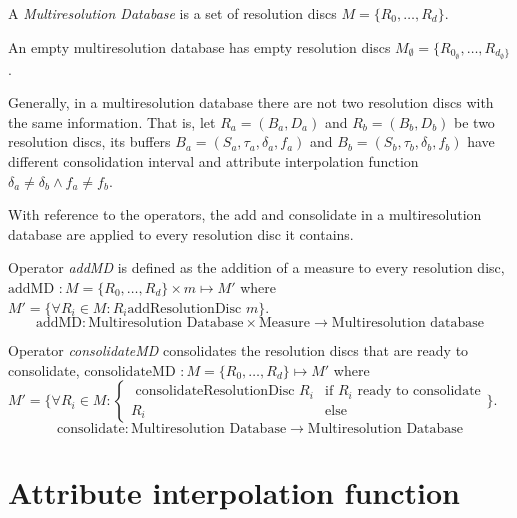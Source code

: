 \begin{definition}
  A \emph{Multiresolution Database} is a set of resolution discs
  $M=\{R_0,\dotsc,R_d\}$.
\end{definition}

An empty multiresolution database has empty resolution discs $M_{\emptyset}=\{R_{0_{\emptyset}},\dotsc,R_{d_{\emptyset}\}}$. 
 
Generally, in a multiresolution database there are not two resolution discs
with the same information. That is, let $R_a = (B_a, D_a)$ and $R_b =
(B_b, D_b)$ be two resolution discs, its buffers
$B_a=(S_a,\tau_a,\delta_a,f_a)$ and $B_b=(S_b,\tau_b,\delta_b,f_b)$
have different consolidation interval and attribute interpolation function
$\delta_a \neq \delta_b \wedge f_a \neq f_b$.


With reference to the operators, the add and consolidate in a
multiresolution database are applied to every resolution disc it
contains.


Operator \emph{addMD} is defined as the addition of a measure to every
resolution disc, $\text{addMD } : M=\{R_0,\dotsc,R_d\} \times m
\mapsto M' $ where $M'= \{ \forall R_i\in M: R_i \text{
  addResolutionDisc } m \}$.
\[
\text{addMD}: \text{Multiresolution Database} \times \text{Measure}
\longrightarrow \text{Multiresolution database}
\]


Operator \emph{consolidateMD} consolidates the resolution discs that
are ready to consolidate, $\text{consolidateMD } :
M=\{R_0,\dotsc,R_d\} \mapsto M'$ where $ M'= \big\{ \forall R_i\in M:
  \begin{cases}
    \text{ consolidateResolutionDisc } R_i & \text{if } R_i \text{ ready to consolidate} \\
    R_i & \text{else }
  \end{cases}\big\}
  $.
\[
\text{consolidate}: \text{Multiresolution Database} \longrightarrow
\text{Multiresolution Database}
  \]








\section{Attribute interpolation function}
\label{sec:model:interpolador}


